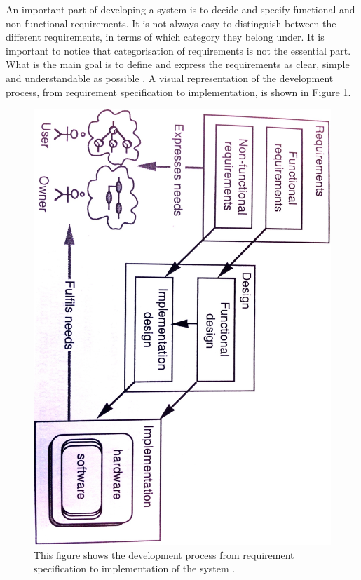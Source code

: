 An important part of developing a system is to decide and specify functional and non-functional requirements. It is not always easy to distinguish between the different requirements, in terms of which category they belong under. It is important to notice that categorisation of requirements is not the essential part. What is the main goal is to define and express the requirements as clear, simple and understandable as possible \cite{systemutviklingDel1}. A visual representation of the development process, from requirement specification to implementation, is shown in Figure \ref{fig:requirements}.  

\begin{figure} [H]
\centering
\includegraphics[scale=0.1]{requirements.jpg}
\caption[Main descriptions of system design]{This figure shows the development process from requirement specification to implementation of the system \cite{systemutviklingDel1}.}
\label{fig:requirements}
\end{figure} 

